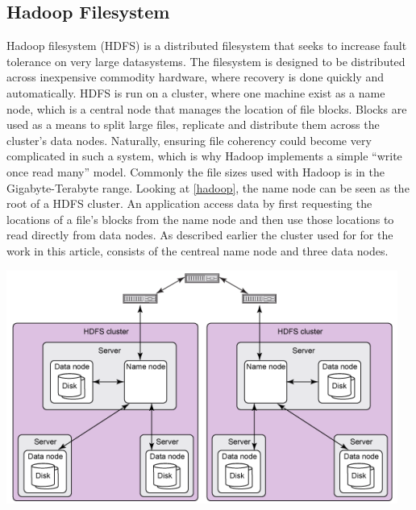 \subsection{Hadoop Filesystem}

Hadoop filesystem (HDFS) is a distributed filesystem that seeks to increase fault tolerance on very large datasystems. The filesystem is designed to be distributed across inexpensive commodity hardware, where recovery is done quickly and automatically. HDFS is run on a cluster, where one machine exist as a name node, which is a central node that manages the location of file blocks. Blocks are used as a means to split large files, replicate and distribute them across the cluster’s data nodes. Naturally, ensuring file coherency could become very complicated in such a system, which is why Hadoop implements a simple “write once read many” model. Commonly the file sizes used with Hadoop is in the Gigabyte-Terabyte range.
Looking at \cref{hadoop}, the name node can be seen as the root of a HDFS cluster. An application access data by first requesting the locations of a file’s blocks from the name node and then use those locations to read directly from data nodes. As described earlier the cluster used for for the work in this article, consists of the centreal name node and three data nodes.~\cite{hadoopIntro} 

\includegraphics[scale=1]{cluster/images/hadoopoverview.png} \label{hadoop} 
